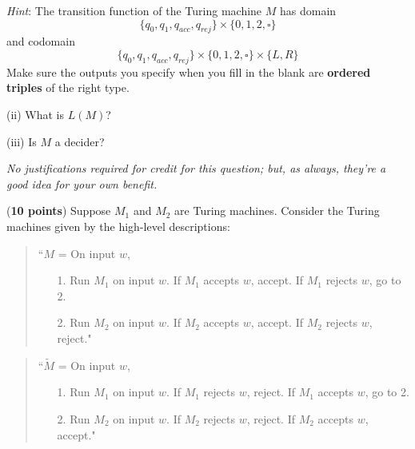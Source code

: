 \documentclass[10pt,letterpaper,unboxed,cm]{hmcpset}
\begin{document}
\begin{problem}[2.]
\begin{itemize}
{\it Hint}: The transition function of the Turing machine $M$ has domain 
\[
\{q_0, q_1, q_{acc}, q_{rej}\} \times \{0,1,2,\square\}
\]
and codomain 
\[
\{q_0, q_1, q_{acc}, q_{rej}\} \times \{0,1,2,\square\} \times \{L, R \}
\]
Make sure the outputs you specify when you fill in the blank are {\bf ordered triples} of the right type.


(ii) What is $L(M)$?

(iii) Is $M$ a decider?


\end{itemize}

{\it No justifications required for credit for this question; but, as always, they're a good idea for your own benefit.}


\end{problem}

\begin{problem}[3.] ({\bf 10 points}) 
Suppose $M_1$ and $M_2$ are Turing machines. Consider the Turing machines given by the
high-level descriptions:
\begin{quote}
``$M$ = On input $w$,
\begin{itemize}
\item[1.] Run $M_1$ on input $w$.  If $M_1$ accepts $w$, accept.  If $M_1$ rejects $w$, go to 2.
\item[2.] Run $M_2$ on input $w$. If $M_2$ accepts $w$, accept.  If $M_2$ rejects $w$, reject."
\end{itemize}
\end{quote}
\begin{quote}
``$\tilde{M}$ = On input $w$,
\begin{itemize}
\item[1.] Run $M_1$ on input $w$.  If $M_1$ rejects $w$, reject.  If $M_1$ accepts $w$, go to 2.
\item[2.] Run $M_2$ on input $w$. If $M_2$ rejects $w$, reject.  If $M_2$ accepts $w$, accept."
\end{itemize}
\end{quote}



\end{problem}
\end{document}
